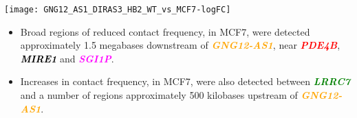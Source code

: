 \documentclass[a0paper, portrait]{baposter}
\begin{document}
\begin{poster}
{\begin{center}
\texttt{[image: GNG12\_AS1\_DIRAS3\_HB2\_WT\_vs\_MCF7-logFC]}
\end{center}

\begin{itemize}[leftmargin=*]
\item Broad regions of reduced contact frequency, in MCF7, were detected approximately 1.5 megabases downstream of \textcolor{orange}{\textit{\textbf{GNG12-AS1}}}, near \textcolor{red}{\textit{\textbf{PDE4B}}}, \textcolor{black}{\textit{\textbf{MIRE1}}} and \textcolor{magenta}{\textit{\textbf{SGI1P}}}.
\item Increases in contact frequency, in MCF7, were also detected between \textcolor{green}{\textit{\textbf{LRRC7}}} and a number of regions approximately 500 kilobases upstream of \textcolor{orange}{\textit{\textbf{GNG12-AS1}}}.
\end{itemize}
}

\end{poster}
\end{document}
